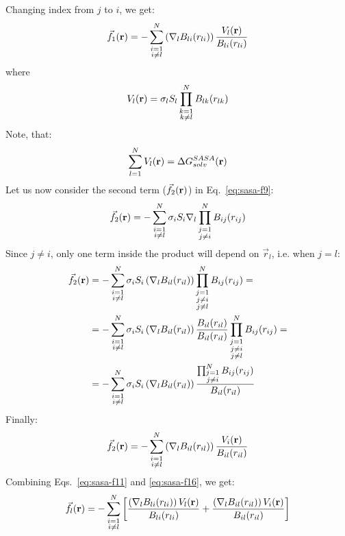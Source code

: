 \documentclass[11pt]{book}
\begin{document}
Changing index from $j$ to $i$, we get:
\begin{equation}\label{eq:sasa-f11}
\vec{f}_{1}({\bf r})=-\sum_{\substack{i=1\\i\ne l}}^{N}\left(\nabla_{l}B_{li}(r_{li})\right)\frac{V_{l}({\bf r})}{B_{li}(r_{li})}
\end{equation}
where
\begin{equation}\label{eq:sasa-f12}
V_{l}({\bf r})=\sigma_{l}S_{l}\prod_{\substack{k=1\\k\ne l}}^{N}B_{lk}(r_{lk})
\end{equation}
Note, that:
\begin{equation}\label{eq:sasa-f13}
\sum_{l=1}^{N}V_{l}({\bf r})=\Delta G_{solv}^{SASA}({\bf r})
\end{equation}
Let us now consider the second term ($\vec{f}_{2}({\bf r})$) in Eq.~\ref{eq:sasa-f9}:
\begin{equation}\label{eq:sasa-f14}
\vec{f}_{2}({\bf r})=-\sum_{\substack{i=1\\i\ne l}}^{N}\sigma_{i}S_{i}\nabla_{l}\prod_{\substack{j=1\\j\ne i}}^{N}B_{ij}(r_{ij})
\end{equation}
Since $j\ne i$, only one term inside the product will depend on $\vec{r}_l$, i.e. when $j=l$:
\begin{equation}\label{eq:sasa-f15}
\begin{split}
\vec{f}_{2}({\bf r})&=-\sum_{\substack{i=1\\i\ne l}}^{N}\sigma_{i}S_{i}\left(\nabla_{l}B_{il}(r_{il})\right)\prod_{\substack{j=1\\j\ne i\\j\ne l}}^{N}B_{ij}(r_{ij})=\\
&=-\sum_{\substack{i=1\\i\ne l}}^{N}\sigma_{i}S_{i}\left(\nabla_{l}B_{il}(r_{il})\right)\frac{B_{il}(r_{il})}{B_{il}(r_{il})}\prod_{\substack{j=1\\j\ne i\\j\ne l}}^{N}B_{ij}(r_{ij})=\\
&=-\sum_{\substack{i=1\\i\ne l}}^{N}\sigma_{i}S_{i}\left(\nabla_{l}B_{il}(r_{il})\right)\frac{\prod_{\substack{j=1\\j\ne i}}^{N}B_{ij}(r_{ij})}{B_{il}(r_{il})}
\end{split}
\end{equation}
Finally:
\begin{equation}\label{eq:sasa-f16}
\vec{f}_{2}({\bf r})=-\sum_{\substack{i=1\\i\ne l}}^{N}\left(\nabla_{l}B_{il}(r_{il})\right)\frac{V_{i}({\bf r})}{B_{il}(r_{il})}
\end{equation}
Combining Eqs.~\ref{eq:sasa-f11} and \ref{eq:sasa-f16}, we get:
\begin{equation}\label{eq:sasa-f17}
\vec{f}_{l}({\bf r})=-\sum_{\substack{i=1\\i\ne l}}^{N}\left[\frac{\left(\nabla_{l}B_{li}(r_{li})\right)V_{l}({\bf r})}{B_{li}(r_{li})}+\frac{\left(\nabla_{l}B_{il}(r_{il})\right)V_{i}({\bf r})}{B_{il}(r_{il})}\right]
\end{equation}
\end{document}
